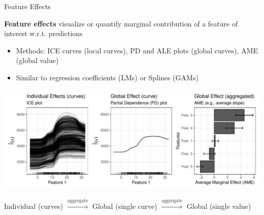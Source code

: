 \documentclass[11pt,compress,t,notes=noshow, aspectratio=169, xcolor=table]{beamer}
\begin{document}
\begin{frame}{Feature Effects}

\textbf{Feature effects} visualize or quantify marginal contribution of a feature of interest w.r.t. predictions %
\begin{itemize}
\item Methods: ICE curves (local curves), PD and ALE plots (global curves), AME (global value)
\item Similar to regression coefficients (LMs) or Splines (GAMs)
\end{itemize}

\centerline{\includegraphics[width=\textwidth]{figure/feature-effect.pdf}}

\centerline{\small \hspace{20px} Individual (curves) \hspace{8px}
$\xrightarrow[]{\text{aggregate}}$ \hspace{8px} Global (single curve) \hspace{8px}
$\xrightarrow[]{\text{aggregate}}$ \hspace{8px} Global (single value)}


\end{frame}


\endlecture
\end{document}

